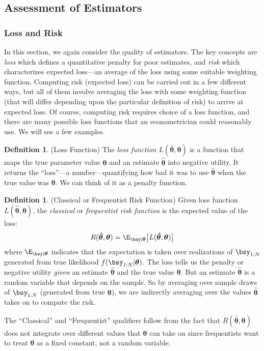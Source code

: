 \documentclass[12pt]{article}
\theoremstyle{plain}
\theoremstyle{definition}
\newtheorem{defn}[thm]{Definition}
\theoremstyle{remark}
\newcommand{\bstheta}{\boldsymbol{\theta}}
\newcommand{\bshattheta}{\boldsymbol{\hat{\theta}}}
\begin{document}
\clearpage
\subsection{Assessment of Estimators}

\subsubsection{Loss and Risk}

In this section, we again consider the quality of estimators.  The key
concepts are \emph{loss} which defines a quantitative penalty for poor
estimates, and \emph{risk} which characterizes expected loss---an
average of the loss using some suitable weighting function. Computing
risk (expected loss) can be carried out in a few different ways, but all
of them involve averaging the loss with some weighting function (that
will differ depending upon the particular definition of risk) to arrive
at expected loss. Of course, computing risk requires choice of a loss
function, and there are many possible loss functions that an
econometrician could reasonably use. We will see a few examples.

\begin{defn}(Loss Function)
The \emph{loss function} $L(\bshattheta,\bstheta)$ is a function that
maps the true parameter value $\bstheta$ and an estimate $\bshattheta$
into negative utility. It returns the ``loss''---a number---quantifying
how bad it was to use $\bshattheta$ when the true value was $\bstheta$.
We can think of it as a penalty function.
\end{defn}

\begin{defn}{(Classical or Frequentist Risk Function)}
Given loss function $L(\bshattheta,\bstheta)$, the \emph{classical} or
\emph{frequentist risk function} is the expected value of the loss:
\begin{align*}
  R(\bshattheta,\bstheta)
  = \E_{\bsy|\bstheta}\big[L(\bshattheta,\bstheta)\big]
\end{align*}
where $\E_{\bsy|\bstheta}$ indicates that the expectation is taken over
realizations of $\bsy_{1:N}$ generated from true likelihood
$f(\bsy_{1:N}|\bstheta)$.
The loss tells us the penalty or negative utility \emph{given} an
estimate $\bshattheta$ and the true value $\bstheta$. But an estimate
$\bshattheta$ is a random variable that depends on the sample.
So by averaging over sample draws of $\bsy_{1:N}$ (generated from true
$\bstheta$), we are indirectly averaging over the values $\bshattheta$
takes on to compute the risk.

The ``Classical'' and ``Frequentist'' qualifiers follow from the fact
that $R(\bshattheta,\bstheta)$ does not integrate over different values
that $\bstheta$ can take on since frequentists want to treat $\bstheta$
as a fixed constant, not a random variable.
\end{defn}
\end{document}
